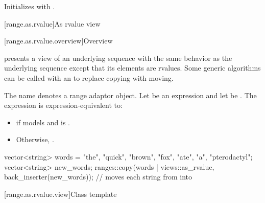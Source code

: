 \begin{itemdescr}
\pnum
\effects
Initializes  with .
\end{itemdescr}

[range.as.rvalue]{As rvalue view}

[range.as.rvalue.overview]{Overview}

\pnum
{} presents a view of an underlying sequence
with the same behavior as the underlying sequence
except that its elements are rvalues.
Some generic algorithms can be called with an 
to replace copying with moving.

\pnum
{}%
The name  denotes
a range adaptor object.
Let  be an expression and let  be .
The expression  is expression-equivalent to:
\begin{itemize}
\item
{} if
 models  and
 is .
\item
Otherwise, .
\end{itemize}

\pnum
\begin{example}
\begin{codeblock}
vector<string> words = {"the", "quick", "brown", "fox", "ate", "a", "pterodactyl"};
vector<string> new_words;
ranges::copy(words | views::as_rvalue, back_inserter(new_words));
  // moves each string from  into 
\end{codeblock}
\end{example}

[range.as.rvalue.view]{Class template }

